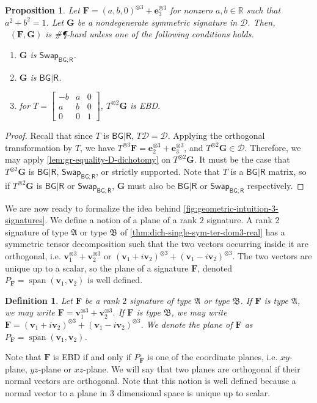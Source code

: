 \documentclass[11pt]{article}
\newtheorem{definition}[theorem]{Definition}
\newtheorem{proposition}[theorem]{Proposition}
\DeclareMathOperator{\holts}{Holant^*_3}
\DeclareMathOperator{\spn}{span}
\newcommand{\db}{\mathsf{B}}
\newcommand{\dg}{\mathsf{G}}
\newcommand{\dr}{\mathsf{R}}
\newcommand{\swhelper}[1]{$\mathsf{Swap}_{#1}$\xspace}
\newcommand{\swbg}{\swhelper{\db \dg; \dr}}
\newcommand{\sph}{\#\P-hard\xspace}
\newcommand{\teh}{^{\otimes 3}}
\newcommand{\tew}{^{\otimes 2}}
\newcommand{\strspt}{\textsf{EBD}\xspace}
\newcommand{\ternarytractgeneq}{$\mathfrak{A}$\xspace}
\newcommand{\ternarytractz}{$\mathfrak{B}$\xspace}
\begin{document}
\begin{proposition}\label{prop:bg-r-d-do-not-mix}
  Let $\mathbf{F} = (a, b, 0)\teh + \mathbf{e}_3\teh$ for nonzero $a, b \in \mathbb{R}$ such that $a^2 + b^2 = 1$.
  Let $\mathbf{G}$ be a nondegenerate symmetric signature in $\mathcal{D}$.
  Then, $\holts(\mathbf{F}, \mathbf{G})$ is \sph unless one of the following conditions holds.
  \begin{enumerate}
    \item $\mathbf{G}$ is \swbg.
    \item $\mathbf{G}$ is $\db \dg | \dr$.
    \item for $T = \begin{bmatrix}
        -b & a & 0 \\
        a & b & 0 \\
        0 & 0 & 1
      \end{bmatrix}$, $T\tew \mathbf{G}$ is \strspt.
  \end{enumerate}
\end{proposition}
\begin{proof}
  Recall that since $T$ is $\db \dg | \dr$, $T \mathcal{D} = \mathcal{D}$.
  Applying the orthogonal transformation by $T$, we have $T\teh \mathbf{F} = \mathbf{e}_2\teh + \mathbf{e}_3\teh$, 
  and $T\tew \mathbf{G} \in \mathcal{D}$.
  Therefore, we may apply \cref{lem:gr-equality-D-dichotomy} on $T \tew \mathbf{G}$.
  It must be the case that $T\tew \mathbf{G}$ is $\db \dg | \dr$, \swbg, or strictly supported.
  Note that $T$ is a $\db \dg | \dr$ matrix, so if $T\tew \mathbf{G}$ is $\db \dg | \dr$ or \swbg,
  $\mathbf{G}$ must also be $\db \dg | \dr$ or \swbg respectively.
\end{proof}

We are now ready to formalize the idea behind \cref{fig:geometric-intuition-3-signatures}. 
We define a notion of a plane of a rank $2$ signature.
A rank 2 signature of type \ternarytractgeneq or type \ternarytractz of \cref{thm:dich-single-sym-ter-dom3-real} has a symmetric tensor decomposition such that the two vectors occurring inside it are orthogonal, i.e. $\mathbf{v}_1\teh + \mathbf{v}_2\teh$ or $(\mathbf{v}_1 + i \mathbf{v}_2)\teh + (\mathbf{v}_1 - i \mathbf{v}_2)\teh$.
The two vectors are unique up to a scalar, so the plane of a signature $\mathbf{F}$, denoted $P_{\mathbf{F}} = \spn(\mathbf{v}_1, \mathbf{v}_2)$ is well defined.
\begin{definition}
  Let $\mathbf{F}$ be a rank $2$ signature of type \ternarytractgeneq or type \ternarytractz.
  If $\mathbf{F}$ is type \ternarytractgeneq, we may write $\mathbf{F} = \mathbf{v}_1\teh + \mathbf{v}_2\teh$.
  If $\mathbf{F}$ is type \ternarytractz, we may write $\mathbf{F} = (\mathbf{v}_1 + i \mathbf{v}_2)\teh + (\mathbf{v}_1 - i \mathbf{v}_2)\teh$.
  We denote the plane of $\mathbf{F}$ as $P_{\mathbf{F}} = \spn(\mathbf{v}_1, \mathbf{v}_2)$.
\end{definition}
Note that $\mathbf{F}$ is \strspt if and only if $P_{\mathbf{F}}$ is one of the coordinate planes, i.e. $xy$-plane, $yz$-plane or $xz$-plane.
We will say that two planes are orthogonal if their normal vectors are orthogonal.
Note that this notion is well defined because a normal vector to a plane in $3$ dimensional space is unique up to scalar.
\end{document}

